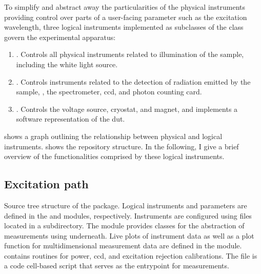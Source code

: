 To simplify and abstract away the particularities of the physical instruments providing control over parts of a user-facing parameter such as the excitation wavelength,
three logical instruments implemented as subclasses of the \qcodes {} class govern the experimental apparatus:
\begin{enumerate}\label{enm:logical_instruments}
    \item \label{itm:logical_instruments:exc}
        .
        Controls all physical instruments related to illumination of the sample, including the white light source.
    \item \label{itm:logical_instruments:det}
        .
        Controls instruments related to the detection of radiation emitted by the sample, \ie, the spectrometer, \acrshort{ccd}, and photon counting card.
    \item \label{itm:logical_instruments:sam}
        .
        Controls the \qdac voltage source, cryostat, and magnet, and implements a software representation of the \gls{dut}.
\end{enumerate}
 shows a graph outlining the relationship between physical and logical instruments.
 shows the repository structure.
In the following, I give a brief overview of the functionalities comprised by these logical instruments.

\subsection{Excitation path}\label{subsec:exp:mjolnir:logical_instruments:exc}
\begin{marginfigure}
    
    \caption[]{
        Source tree structure of the \mjolnir package.
        Logical \qcodes instruments and parameters are defined in the  and  modules, respectively.
        Instruments are configured using  files located in a  subdirectory.
        The  module provides classes for the abstraction of measurements using \qcodes underneath.
        Live plots of instrument data as well as a plot function for multidimensional measurement data are defined in the  module.
         contains routines for power, \acrshort{ccd}, and excitation rejection calibrations.
        The  file is a code cell-based script that serves as the entrypoint for measurements.
    }
    \label{fig:exp:mjolnir:tree}
\end{marginfigure}

